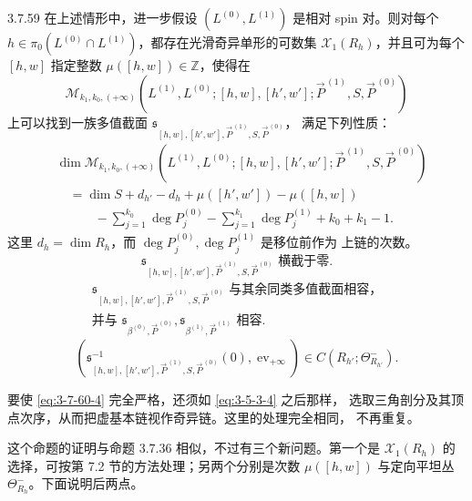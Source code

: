 \begin{proposition}{3.7.59}\label{prop:3-7-59}
在上述情形中，进一步假设 $(L^{(0)},L^{(1)})$ 是相对 spin 对。则对每个
$h\in\pi_0(L^{(0)}\cap L^{(1)})$，都存在光滑奇异单形的可数集
$\mathcal X_1(R_h)$，并且可为每个 $[h,w]$ 指定整数
$\mu([h,w])\in\mathbb Z$，使得在
\[
 \mathcal M_{k_1,k_0,(+\infty)}
 (L^{(1)},L^{(0)};[h,w],[h',w'];
 \vec P^{\,(1)},S,\vec P^{\,(0)})
\]
上可以找到一族多值截面
$\mathfrak s_{[h,w],[h',w'],\vec P^{\,(1)},S,\vec P^{\,(0)}}$，
满足下列性质：
\begin{equation}
\begin{aligned}
 &\dim
 \mathcal M_{k_1,k_0,(+\infty)}
 (L^{(1)},L^{(0)};[h,w],[h',w'];
 \vec P^{\,(1)},S,\vec P^{\,(0)})\\
 &\quad=
 \dim S+d_{h'}-d_h+\mu([h',w'])-\mu([h,w])\\
 &\qquad\quad
 -\sum_{j=1}^{k_0}\deg P_j^{(0)}
 -\sum_{j=1}^{k_1}\deg P_j^{(1)}
 +k_0+k_1-1.
\end{aligned}
\tag{3.7.60.1}\label{eq:3-7-60-1}
\end{equation}
这里 $d_h=\dim R_h$，而 $\deg P_j^{(0)},\deg P_j^{(1)}$ 是移位前作为
上链的次数。
\begin{equation}
 \mathfrak s_{[h,w],[h',w'],\vec P^{\,(1)},S,\vec P^{\,(0)}}
 \text{ 横截于零}.
\tag{3.7.60.2}\label{eq:3-7-60-2}
\end{equation}
\begin{equation}
\begin{gathered}
 \mathfrak s_{[h,w],[h',w'],\vec P^{\,(1)},S,\vec P^{\,(0)}}
 \text{ 与其余同类多值截面相容，}\\
 \text{并与 }
 \mathfrak s_{\beta^{(0)},\vec P^{\,(0)}},
 \mathfrak s_{\beta^{(1)},\vec P^{\,(1)}}
 \text{ 相容}.
\end{gathered}
\tag{3.7.60.3}\label{eq:3-7-60-3}
\end{equation}
\begin{equation}
 \left(
 \mathfrak s_{[h,w],[h',w'],\vec P^{\,(1)},S,\vec P^{\,(0)}}^{-1}(0),
 \operatorname{ev}_{+\infty}
 \right)
 \in C(R_{h'};\Theta^-_{R_{h'}}).
\tag{3.7.60.4}\label{eq:3-7-60-4}
\end{equation}
\end{proposition}

要使 \eqref{eq:3-7-60-4} 完全严格，还须如 \eqref{eq:3-5-3-4} 之后那样，
选取三角剖分及其顶点次序，从而把虚基本链视作奇异链。这里的处理完全相同，
不再重复。

这个命题的证明与命题 3.7.36 相似，不过有三个新问题。第一个是
$\mathcal X_1(R_h)$ 的选择，可按第 7.2 节的方法处理；另两个分别是次数
$\mu([h,w])$ 与定向平坦丛 $\Theta^-_{R_h}$。下面说明后两点。

